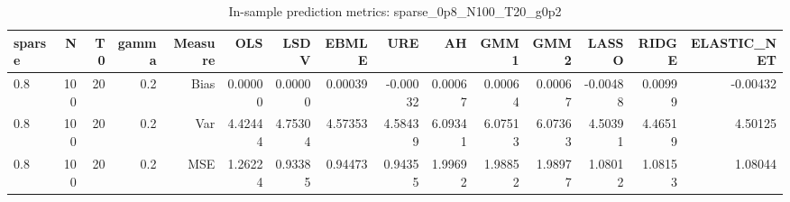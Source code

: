 \begin{table}[!htbp]\centering
\caption{In-sample prediction metrics: sparse_0p8_N100_T20_g0p2}
\label{tab:table2_sparse_0p8_N100_T20_g0p2}
\begin{tabular}{lrrrrrrrrrrrrrr}
\hline
sparse & N & T0 & gamma & Measure & OLS & LSDV & EBMLE & URE & AH & GMM1 & GMM2 & LASSO & RIDGE & ELASTIC_NET \\
\hline
0.8 & 100 & 20 & 0.2 & Bias & 0.00000 & 0.00000 & 0.00039 & -0.00032 & 0.00067 & 0.00064 & 0.00067 & -0.00488 & 0.00999 & -0.00432 \\
0.8 & 100 & 20 & 0.2 & Var & 4.42444 & 4.75304 & 4.57353 & 4.58439 & 6.09341 & 6.07513 & 6.07363 & 4.50391 & 4.46519 & 4.50125 \\
0.8 & 100 & 20 & 0.2 & MSE & 1.26224 & 0.93385 & 0.94473 & 0.94355 & 1.99692 & 1.98852 & 1.98977 & 1.08012 & 1.08153 & 1.08044 \\
\hline
\end{tabular}
\end{table}

